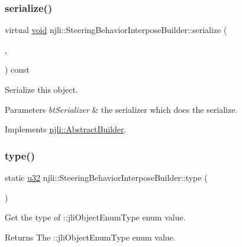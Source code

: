 \subsubsection{\texorpdfstring{serialize()}{serialize()}}
{\footnotesize\ttfamily virtual \mbox{\hyperlink{_thread_8h_af1e856da2e658414cb2456cb6f7ebc66}{void}} njli\+::\+Steering\+Behavior\+Interpose\+Builder\+::serialize (\begin{DoxyParamCaption}\item[{\mbox{\hyperlink{_thread_8h_af1e856da2e658414cb2456cb6f7ebc66}{void}} $\ast$}]{,  }\item[{bt\+Serializer $\ast$}]{ }\end{DoxyParamCaption}) const\hspace{0.3cm}{\ttfamily [virtual]}}

Serialize this object.


\begin{DoxyParams}{Parameters}
{\em bt\+Serializer} & the serializer which does the serialize. \\
\hline
\end{DoxyParams}


Implements \mbox{\hyperlink{classnjli_1_1_abstract_builder_ab66b774e02ccb9da554c9aab7fa6d981}{njli\+::\+Abstract\+Builder}}.

\mbox{\label{classnjli_1_1_steering_behavior_interpose_builder_aea9a5c0db93808fbf297db37b071535d}} 
\subsubsection{\texorpdfstring{type()}{type()}}
{\footnotesize\ttfamily static \mbox{\hyperlink{_util_8h_a10e94b422ef0c20dcdec20d31a1f5049}{u32}} njli\+::\+Steering\+Behavior\+Interpose\+Builder\+::type (\begin{DoxyParamCaption}{ }\end{DoxyParamCaption})\hspace{0.3cm}{\ttfamily [static]}}

Get the type of \+::jli\+Object\+Enum\+Type enum value.

\begin{DoxyReturn}{Returns}
The \+::jli\+Object\+Enum\+Type enum value. 
\end{DoxyReturn}


